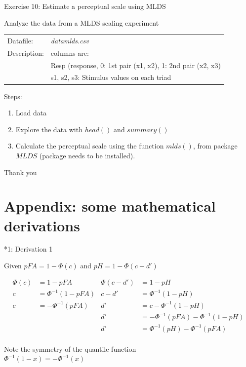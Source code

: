 \documentclass[10pt]{beamer}
\begin{document}
\begin{frame}[fragile]{Exercise 10: Estimate a perceptual scale using MLDS}

Analyze the data from a MLDS scaling experiment

\begin{tabular}{ll}
Datafile: & \textit{datamlds.csv}\\
Description: & columns are: \\
& Resp (response, 0: 1st pair (x1, x2), 1: 2nd pair (x2, x3) \\
& s1, s2, s3: Stimulus values on each triad\\
\end{tabular}

\vspace{10pt}

Steps:
\begin{enumerate}
\item Load data
\item Explore the data with $head()$ and $summary()$
\item Calculate the perceptual scale using the function $mlds()$, from package $MLDS$ (package needs to be installed).
\end{enumerate}

\end{frame}


\begin{frame}
\begin{center}
{\Huge Thank you}
\end{center}
\end{frame}

\section{Appendix: some mathematical derivations}
\begin{frame}{*1: Derivation 1}
\begin{center}
Given $pFA = 1 - \Phi(c)$ and $pH = 1 - \Phi(c - d')$

\begin{align*}
\Phi(c) & = 1 - pFA & \Phi(c - d') & = 1 - pH\\
c & = \Phi^{-1}(1 - pFA) & c - d' & = \Phi^{-1}(1 - pH) \\
c & = -\Phi^{-1}(pFA)  &  d' & = c - \Phi^{-1}(1 - pH)  \\
& & d' & = -\Phi^{-1}(pFA)  - \Phi^{-1}(1 - pH) \\
& & d' & = \Phi^{-1}(pH) - \Phi^{-1}(pFA)\\
\end{align*}

Note the symmetry of the quantile function\\
$\Phi^{-1}(1-x) = -\Phi^{-1}(x)$
\end{center}
\end{frame}
\end{document}
